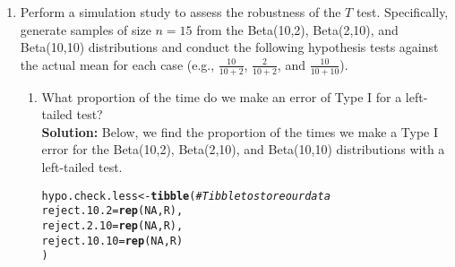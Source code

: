 \documentclass{article}\usepackage[]{graphicx}\usepackage[]{xcolor}
\makeatletter
\newcommand{\hlnum}[1]{\textcolor[rgb]{0.686,0.059,0.569}{#1}}%
\newcommand{\hlcom}[1]{\textcolor[rgb]{0.678,0.584,0.686}{\textit{#1}}}%
\newcommand{\hlopt}[1]{\textcolor[rgb]{0,0,0}{#1}}%
\newcommand{\hldef}[1]{\textcolor[rgb]{0.345,0.345,0.345}{#1}}%
\newcommand{\hlkwb}[1]{\textcolor[rgb]{0.69,0.353,0.396}{#1}}%
\newcommand{\hlkwc}[1]{\textcolor[rgb]{0.333,0.667,0.333}{#1}}%
\newcommand{\hlkwd}[1]{\textcolor[rgb]{0.737,0.353,0.396}{\textbf{#1}}}%
\newenvironment{kframe}{%
 \def\at@end@of@kframe{}%
 \ifinner\ifhmode%
  \def\at@end@of@kframe{\end{minipage}}%
  \begin{minipage}{\columnwidth}%
 \fi\fi%
 \def\FrameCommand##1{\hskip\@totalleftmargin \hskip-\fboxsep
 \colorbox{shadecolor}{##1}\hskip-\fboxsep
     \hskip-\linewidth \hskip-\@totalleftmargin \hskip\columnwidth}%
 \MakeFramed {\advance\hsize-\width
   \@totalleftmargin\z@ \linewidth\hsize
   \@setminipage}}%
 {\par\unskip\endMakeFramed%
 \at@end@of@kframe}
\newenvironment{knitrout}{}{} %
\makeatother
\begin{document}
\begin{enumerate}
  \item Perform a simulation study to assess the robustness of the $T$ test. 
  Specifically, generate samples of size $n=15$ from the Beta(10,2), Beta(2,10), 
  and Beta(10,10) distributions and conduct the following hypothesis tests against 
  the actual mean for each case (e.g., $\frac{10}{10+2}$, $\frac{2}{10+2}$, and 
  $\frac{10}{10+10}$). 
  \begin{enumerate}
    \item What proportion of the time do we make an error of Type I for a
    left-tailed test? \\
    \textbf{Solution:} Below, we find the proportion of the times we make a Type I error for the Beta(10,2), Beta(2,10), and Beta(10,10) distributions with a left-tailed test.
\begin{knitrout}\scriptsize
{}\color{fgcolor}\begin{kframe}
\begin{alltt}
\hldef{hypo.check.less} \hlkwb{<-} \hlkwd{tibble}\hldef{(} \hlcom{#Tibble to store our data}
  \hlkwc{reject.10.2} \hldef{=} \hlkwd{rep}\hldef{(}\hlnum{NA}\hldef{, R),}
  \hlkwc{reject.2.10} \hldef{=} \hlkwd{rep}\hldef{(}\hlnum{NA}\hldef{, R),}
  \hlkwc{reject.10.10} \hldef{=} \hlkwd{rep}\hldef{(}\hlnum{NA}\hldef{, R)}
\hldef{)}


\end{alltt}
\end{kframe}
\end{knitrout}
\end{enumerate}
\end{enumerate}
\end{document}
